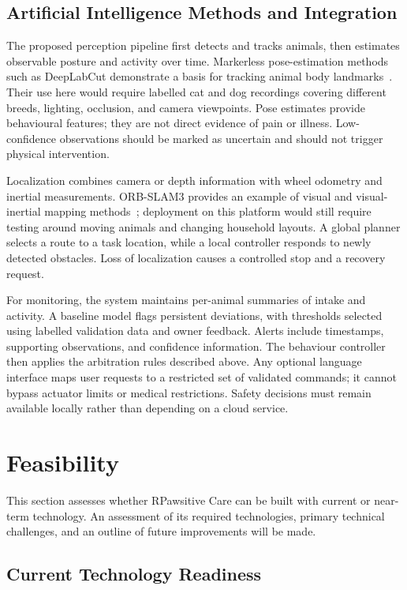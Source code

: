 \documentclass[conference,letterpaper]{IEEEtran}
\begin{document}
\subsection{Artificial Intelligence Methods and Integration}

The proposed perception pipeline first detects and tracks animals, then estimates observable posture and activity over time. Markerless pose-estimation methods such as DeepLabCut demonstrate a basis for tracking animal body landmarks~\cite{deeplabcut}. Their use here would require labelled cat and dog recordings covering different breeds, lighting, occlusion, and camera viewpoints. Pose estimates provide behavioural features; they are not direct evidence of pain or illness. Low-confidence observations should be marked as uncertain and should not trigger physical intervention.

Localization combines camera or depth information with wheel odometry and inertial measurements. ORB-SLAM3 provides an example of visual and visual-inertial mapping methods~\cite{orbslam}; deployment on this platform would still require testing around moving animals and changing household layouts. A global planner selects a route to a task location, while a local controller responds to newly detected obstacles. Loss of localization causes a controlled stop and a recovery request.

For monitoring, the system maintains per-animal summaries of intake and activity. A baseline model flags persistent deviations, with thresholds selected using labelled validation data and owner feedback. Alerts include timestamps, supporting observations, and confidence information. The behaviour controller then applies the arbitration rules described above. Any optional language interface maps user requests to a restricted set of validated commands; it cannot bypass actuator limits or medical restrictions. Safety decisions must remain available locally rather than depending on a cloud service.

\section{Feasibility}

This section assesses whether RPawsitive Care can be built with current or near-term technology. An assessment of its required technologies, primary technical challenges, and an outline of future improvements will be made.

\subsection{Current Technology Readiness}
\end{document}
